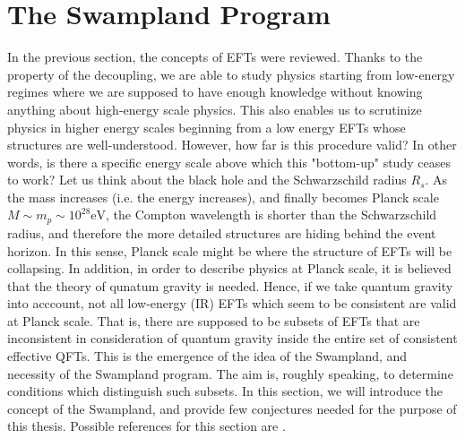 \section{The Swampland Program}
In the previous section, the concepts of EFTs were reviewed. Thanks to the property of the decoupling, we are able to study physics starting from low-energy regimes where we are supposed to have enough knowledge without knowing anything about high-energy scale physics. This also enables us to scrutinize physics in higher energy scales beginning from a low energy EFTs whose structures are well-understood. However, how far is this procedure valid? In other words, is there a specific energy scale above which this "bottom-up" study ceases to work? Let us think about the black hole and the Schwarzschild radius $R_{s}$. As the mass increases (i.e. the energy increases), and finally becomes Planck scale $M \sim m_{p} \sim 10^{28} \text{eV}$, the Compton wavelength is shorter than the Schwarzschild radius, and therefore the more detailed structures are hiding behind the event horizon. In this sense, Planck scale might be where the structure of EFTs will be collapsing. In addition, in order to describe physics at Planck scale, it is believed that the theory of qunatum gravity is needed. Hence, if we take quantum gravity into acccount, not all low-energy (IR) EFTs which seem to be consistent are valid at Planck scale. That is, there are supposed to be subsets of EFTs that are inconsistent in consideration of quantum gravity inside the entire set of consistent effective QFTs. This is the emergence of the idea of the Swampland, and necessity of the Swampland program. The aim is, roughly speaking, to determine conditions which distinguish such subsets. In this section, we will introduce the concept of the Swampland, and provide few conjectures needed for the purpose of this thesis. Possible references for this section are \parencite{agmon_lectures_2022}. 

